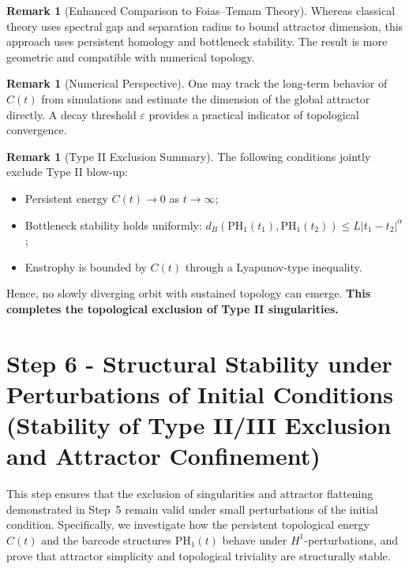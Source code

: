 \documentclass[11pt]{article}
\theoremstyle{definition}
\newtheorem{remark}[theorem]{Remark}
\begin{document}
\begin{remark}[Enhanced Comparison to Foias--Temam Theory]
Whereas classical theory uses spectral gap and separation radius to bound attractor dimension, this approach uses persistent homology and bottleneck stability. The result is more geometric and compatible with numerical topology.
\end{remark}

\begin{remark}[Numerical Perspective]
One may track the long-term behavior of $C(t)$ from simulations and estimate the dimension of the global attractor directly. A decay threshold $\varepsilon$ provides a practical indicator of topological convergence.
\end{remark}

\begin{remark}[Type II Exclusion Summary]
The following conditions jointly exclude Type II blow-up:
\begin{itemize}
  \item Persistent energy $C(t) \to 0$ as $t \to \infty$;
  \item Bottleneck stability holds uniformly: $d_B(\mathrm{PH}_1(t_1), \mathrm{PH}_1(t_2)) \le L|t_1 - t_2|^{\alpha}$;
  \item Enstrophy is bounded by $C(t)$ through a Lyapunov-type inequality.
\end{itemize}
Hence, no slowly diverging orbit with sustained topology can emerge. \textbf{This completes the topological exclusion of Type II singularities.}
\end{remark}



\section{Step 6 - Structural Stability under Perturbations of Initial Conditions\\
\small (Stability of Type II/III Exclusion and Attractor Confinement)}
\label{sec:step6}

This step ensures that the exclusion of singularities and attractor flattening demonstrated in Step~5 remain valid under small perturbations of the initial condition. Specifically, we investigate how the persistent topological energy $C(t)$ and the barcode structures $\mathrm{PH}_1(t)$ behave under $H^1$-perturbations, and prove that attractor simplicity and topological triviality are structurally stable.
\end{document}
